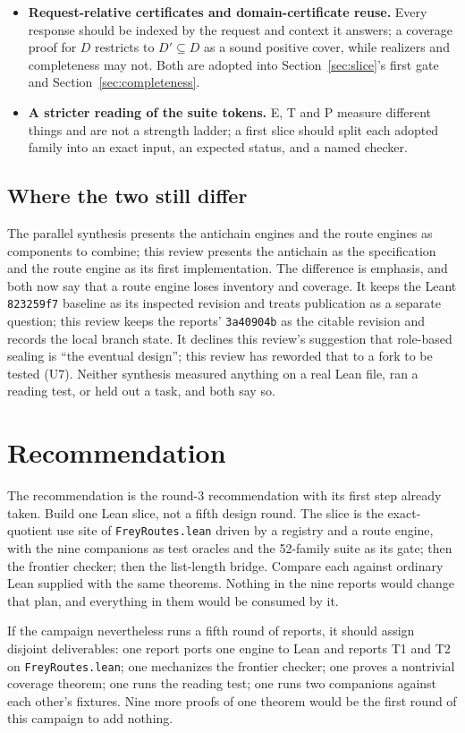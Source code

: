 \documentclass[11pt,a4paper]{article}
\newcommand{\code}[1]{\nolinkurl{#1}}
\theoremstyle{definition}
\theoremstyle{plain}
\begin{document}
\begin{itemize}
\item \textbf{Request-relative certificates and domain-certificate reuse.} Every response should be indexed by the request and context it answers; a coverage proof for $D$ restricts to $D'\subseteq D$ as a sound positive cover, while realizers and completeness may not. Both are adopted into Section~\ref{sec:slice}'s first gate and Section~\ref{sec:completeness}.
\item \textbf{A stricter reading of the suite tokens.} E, T and P measure different things and are not a strength ladder; a first slice should split each adopted family into an exact input, an expected status, and a named checker.
\end{itemize}

\subsection{Where the two still differ}
The parallel synthesis presents the antichain engines and the route engines as components to combine; this review presents the antichain as the specification and the route engine as its first implementation. The difference is emphasis, and both now say that a route engine loses inventory and coverage. It keeps the Leant \code{823259f7} baseline as its inspected revision and treats publication as a separate question; this review keeps the reports' \code{3a40904b} as the citable revision and records the local branch state. It declines this review's suggestion that role-based sealing is ``the eventual design''; this review has reworded that to a fork to be tested (U7). Neither synthesis measured anything on a real Lean file, ran a reading test, or held out a task, and both say so.

\section{Recommendation}\label{sec:recommendation}
The recommendation is the round-3 recommendation with its first step already taken. Build one Lean slice, not a fifth design round. The slice is the exact-quotient use site of \code{FreyRoutes.lean} driven by a registry and a route engine, with the nine companions as test oracles and the 52-family suite as its gate; then the frontier checker; then the list-length bridge. Compare each against ordinary Lean supplied with the same theorems. Nothing in the nine reports would change that plan, and everything in them would be consumed by it.

If the campaign nevertheless runs a fifth round of reports, it should assign disjoint deliverables: one report ports one engine to Lean and reports T1 and T2 on \code{FreyRoutes.lean}; one mechanizes the frontier checker; one proves a nontrivial coverage theorem; one runs the reading test; one runs two companions against each other's fixtures. Nine more proofs of one theorem would be the first round of this campaign to add nothing.
\end{document}
